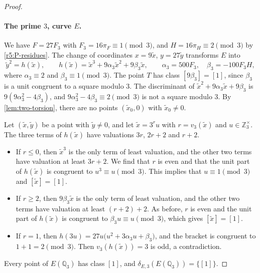\documentclass[12pt,oneside,openany]{book}
\theoremstyle{definition}
\theoremstyle{plain}
\numberwithin{equation}{chapter}
\theoremstyle{plain}
\theoremstyle{definition}
\theoremstyle{remark}
\newcommand{\Q}{\mathbb Q}
\newcommand{\Z}{\mathbb Z}
\newcommand{\sq}[1]{[#1]}
\begin{document}
\begin{proof}
\paragraph{The prime $3$, curve $E$.} We have $F=27F_3$ with $F_3=16\pi_F\equiv1\pmod3$, and $H=16\pi_H\equiv2\pmod3$ by \eqref{r5:P-residues}. The change of coordinates $x=9\tilde x$, $y=27\tilde y$ transforms $E$ into
\[
\tilde y^2=h(\tilde x),\qquad h(\tilde x)=\tilde x^3+9\alpha_3\tilde x^2+9\beta_3\tilde x,\qquad \alpha_3=500F_3,\quad \beta_3=-100F_3H,
\]
where $\alpha_3\equiv2$ and $\beta_3\equiv1\pmod3$. The point $T$ has class $\sq{9\beta_3}=\sq1$, since $\beta_3$ is a unit congruent to a square modulo $3$. The discriminant of $\tilde x^2+9\alpha_3\tilde x+9\beta_3$ is $9(9\alpha_3^2-4\beta_3)$, and $9\alpha_3^2-4\beta_3\equiv2\pmod3$ is not a square modulo $3$. By \cref{lem:two-torsion}, there are no points $(\tilde x_0,0)$ with $\tilde x_0\ne0$.

Let $(\tilde x,\tilde y)$ be a point with $\tilde y\ne0$, and let $\tilde x=3^ru$ with $r=v_3(\tilde x)$ and $u\in\Z_3^\times$. The three terms of $h(\tilde x)$ have valuations $3r$, $2r+2$ and $r+2$.
\begin{itemize}
\item If $r\le0$, then $\tilde x^3$ is the only term of least valuation, and the other two terms have valuation at least $3r+2$. We find that $r$ is even and that the unit part of $h(\tilde x)$ is congruent to $u^3\equiv u\pmod3$. This implies that $u\equiv1\pmod 3$ and $\sq{\tilde x}=\sq1$.
\item If $r\ge2$, then $9\beta_3\tilde x$ is the only term of least valuation, and the other two terms have valuation at least $(r+2)+2$. As before, $r$ is even and the unit part of $h(\tilde x)$ is congruent to $\beta_3u\equiv u\pmod3$, which gives $\sq{\tilde x}=\sq1$.
\item If $r=1$, then $h(3u)=27u\big(u^2+3\alpha_3u+\beta_3\big)$, and the bracket is congruent to $1+1=2\pmod3$. Then $v_3(h(\tilde x))=3$ is odd, a contradiction.
\end{itemize}
Every point of $E(\Q_3)$ has class $\sq1$, and $\delta_{E,3}(E(\Q_3))=\{\sq1\}$.


\end{proof}
\end{document}
